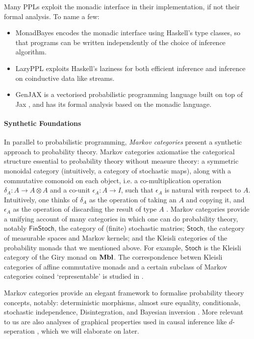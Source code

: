 \documentclass[11pt,a4paper]{article}
\begin{document}
Many PPLs exploit the monadic interface in their implementation, if not their formal analysis. To name a few: \begin{itemize}
    \item MonadBayes \cite{monadbayes1,monadbayes2,monadbayes3} encodes the monadic interface using Haskell's type classes, so that programs can be written independently of the choice of inference algorithm.
    \item LazyPPL \cite{lazyppl} exploits Haskell's laziness for both efficient inference and inference on coinductive data like streams. 
    \item GenJAX \cite{becker26genjax} is a vectorised probabilistic programming language built on top of Jax , and has its formal analysis based on the monadic language.
\end{itemize}


\paragraph{Synthetic Foundations} In parallel to probabilistic programming, \emph{Markov categories} present a synthetic approach to probability theory. Markov categories axiomatise the categorical structure essential to probability theory without measure theory: a symmetric monoidal category (intuitively, a category of stochastic maps), along with a commutative comonoid on each object, i.e. a co-multiplication operation $\delta_A: A \to A \otimes A$ and a co-unit $\epsilon_A: A \to I$, such that $\epsilon_A$ is natural with respect to $A$. Intuitively, one thinks of $\delta_A$ as the operation of taking an $A$ and copying it, and $\epsilon_A$ as the operation of discarding the result of type $A$ . Markov categories provide a unifying account of many categories in which one can do probability theory, notably $\mathsf{FinStoch}$, the category of (finite) stochastic matries; $\mathsf{Stoch}$, the category of measurable spaces and Markov kernels; and the Kleisli categories of the probability monads that we mentioned above. For example, $\mathsf{Stoch}$ is the Kleisli category of the Giry monad on $\mathbf{Mbl}$. The correspondence betwen Kleisli categories of affine commutative monads and a certain subclass of Markov categories coined `representable' is studied in . 

Markov categories provide an elegant framework to formalise probability theory concepts, notably: deterministic morphisms, almost sure equality, conditionals, stochastic independence, Disintegration, and Bayesian inversion . More relevant to us are also analyses of graphical properties used in causal inference like $d$-seperation , which we will elaborate on later.
\end{document}
